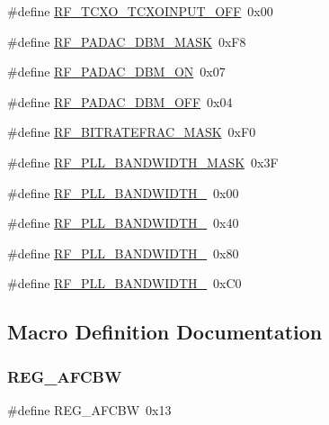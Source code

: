 \begin{DoxyCompactItemize}
\#define \hyperlink{sx1276Regs-Fsk_8h_a120ffcbc3af395153eacc2b979c9e682}{R\+F\+\_\+\+T\+C\+X\+O\+\_\+\+T\+C\+X\+O\+I\+N\+P\+U\+T\+\_\+\+O\+FF}~0x00
\item 
\#define \hyperlink{sx1276Regs-Fsk_8h_a9169e38a9e608f0dc7fd94af67d8a2e6}{R\+F\+\_\+\+P\+A\+D\+A\+C\+\_\+D\+B\+M\+\_\+\+M\+A\+SK}~0x\+F8
\item 
\#define \hyperlink{sx1276Regs-Fsk_8h_ad3f69e485ca56bb333524e2be1687363}{R\+F\+\_\+\+P\+A\+D\+A\+C\+\_\+D\+B\+M\+\_\+\+ON}~0x07
\item 
\#define \hyperlink{sx1276Regs-Fsk_8h_a2e97c98b3d6f8ae20dc9241ef5b346d7}{R\+F\+\_\+\+P\+A\+D\+A\+C\+\_\+D\+B\+M\+\_\+\+O\+FF}~0x04
\item 
\#define \hyperlink{sx1276Regs-Fsk_8h_a15a3a7765ab924197cdf57cbe3fc1160}{R\+F\+\_\+\+B\+I\+T\+R\+A\+T\+E\+F\+R\+A\+C\+\_\+\+M\+A\+SK}~0x\+F0
\item 
\#define \hyperlink{sx1276Regs-Fsk_8h_aac01efdf312f6264cbd8b48d6c94e0ea}{R\+F\+\_\+\+P\+L\+L\+\_\+\+B\+A\+N\+D\+W\+I\+D\+T\+H\+\_\+\+M\+A\+SK}~0x3F
\item 
\#define \hyperlink{sx1276Regs-Fsk_8h_afdfab4acc3525e87ce252cbf593c3255}{R\+F\+\_\+\+P\+L\+L\+\_\+\+B\+A\+N\+D\+W\+I\+D\+T\+H\+\_}~0x00
\item 
\#define \hyperlink{sx1276Regs-Fsk_8h_acb5d72344cac01094235aaf62ac05399}{R\+F\+\_\+\+P\+L\+L\+\_\+\+B\+A\+N\+D\+W\+I\+D\+T\+H\+\_}~0x40
\item 
\#define \hyperlink{sx1276Regs-Fsk_8h_aa5f41821cba4e1c23b0cf8b6eb05d021}{R\+F\+\_\+\+P\+L\+L\+\_\+\+B\+A\+N\+D\+W\+I\+D\+T\+H\+\_}~0x80
\item 
\#define \hyperlink{sx1276Regs-Fsk_8h_ae1e12342489e52885c9de6812079d6e8}{R\+F\+\_\+\+P\+L\+L\+\_\+\+B\+A\+N\+D\+W\+I\+D\+T\+H\+\_}~0x\+C0
\end{DoxyCompactItemize}


\subsection{Macro Definition Documentation}
\mbox{\label{sx1276Regs-Fsk_8h_aa4a7b5b5d63e9f8ef8f8dc4d7984753c}} 
\subsubsection{\texorpdfstring{R\+E\+G\+\_\+\+A\+F\+C\+BW}{REG\_AFCBW}}
{\footnotesize\ttfamily \#define R\+E\+G\+\_\+\+A\+F\+C\+BW~0x13}

